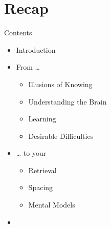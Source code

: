 \documentclass{ercisbeamer}
\begin{document}
\section{Recap}
\begin{frame}{Contents}
    \begin{itemize}
        \item Introduction
        \item From …
        \begin{itemize}
            \item Illusions of Knowing
            \item Understanding the Brain
            \item Learning
            \item Desirable Difficulties
        \end{itemize}
        \item … to your 
        \begin{itemize}
            \item Retrieval
            \item Spacing
            \item Mental Models
        \end{itemize}
        \item {}
    \end{itemize}
\end{frame}
\end{document}
